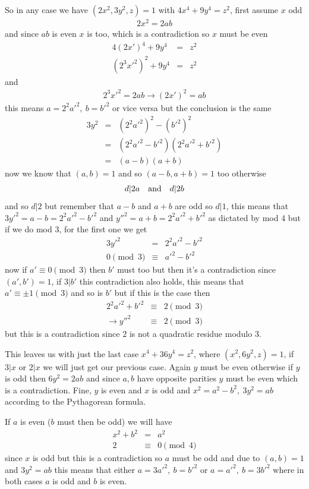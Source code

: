\documentclass[aps,preprint,preprintnumbers,nofootinbib,showpacs,prd]{revtex4-1}
\newcommand{\nbea}{\begin{eqnarray*}}
\newcommand{\neea}{\end{eqnarray*}}
\begin{document}
So in any case we have $(2x^2,3y^2,z)=1$ with $4x^4 + 9y^4 = z^2$, first assume $x$ odd
%
\nbea
2x^2=2ab
\neea
%
and since $ab$ is even $x$ is too, which is a contradiction so $x$ must be even
%
\nbea
4(2{x'})^4 + 9y^4 & = & z^2 \\
(2^3{x'}^2)^2 + 9y^4 & = & z^2
\neea
%
and
%
\nbea
2^3{x'}^2 = 2ab \to (2{x'})^2 = ab
\neea
%
this means $a = 2^2{a'}^2,~b = {b'}^2$ or vice versa but the conclusion is the same
%
\nbea
3y^2 & = & (2^2{a'}^2)^2 - ({b'}^2)^2 \\
& = & (2^2{a'}^2 - {b'}^2)(2^2{a'}^2 + {b'}^2) \\
& = & (a - b)(a + b)
\neea
%
now we know that $(a,b)=1$ and so $(a-b,a+b)=1$ too otherwise
%
\nbea
d | 2a ~~~{\rm and}~~~ d|2b
\neea
%
and so $d|2$ but remember that $a-b$ and $a+b$ are odd so $d|1$, this means that $3{y'}^2 = a-b = 2^2{a'}^2 - {b'}^2$ and ${y''}^2 = a+b=2^2{a'}^2 + {b'}^2$ as dictated by mod 4 but if we do mod 3, for the first one we get
%
\nbea
3{y'}^2 & = & 2^2{a'}^2 - {b'}^2 \\
0 \pmod{3} & \equiv & {a'}^2 - {b'}^2
\neea
%
now if $a'\equiv0\pmod{3}$ then $b'$ must too but then it's a contradiction since $(a',b')=1$, if $3|b'$ this contradiction also holds, this means that $a' \equiv \pm1\pmod{3}$ and so is $b'$ but if this is the case then
%
\nbea
2^2{a'}^2 + {b'}^2 & \equiv & 2 \pmod{3} \\
\to {y''}^2 & \equiv & 2 \pmod{3}
\neea
%
but this is a contradiction since $2$ is not a quadratic residue modulo 3.

This leaves us with just the last case $x^4 + 36y^4 = z^2$, where $(x^2,6y^2,z) = 1$, if $3|x$ or $2|x$ we will just get our previous case. Again $y$ must be even otherwise if $y$ is odd then $6y^2 = 2ab$ and since $a, b$ have opposite parities $y$ must be even which is a contradiction. Fine, $y$ is even and $x$ is odd and $x^2 = a^2 - b^2,~3y^2=ab$ according to the Pythagorean formula.

If $a$ is even ($b$ must then be odd) we will have
%
\nbea
x^2 + b^2 & = & a^2 \\
2 & \equiv & 0 \pmod{4}
\neea
%
since $x$ is odd but this is a contradiction so $a$ must be odd and due to $(a,b)=1$ and $3y^2 = ab$ this means that either $a = 3{a'}^2, ~b={b'}^2$ or $a = {a'}^2, ~b=3{b'}^2$ where in both cases $a$ is odd and $b$ is even.
\end{document}
